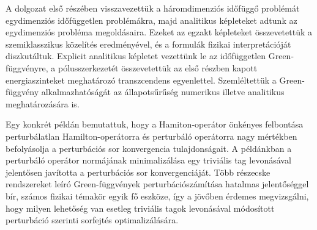 A dolgozat első részében visszavezettük a háromdimenziós időfüggő problémát egydimenziós időfüggetlen problémákra, majd analitikus képleteket adtunk az egydimenziós probléma megoldásaira. Ezeket az egzakt képleteket összevetettük a szemiklasszikus közelítés eredményével, és a formulák fizikai interpretációját diszkutáltuk. Explicit analitikus képletet vezettünk le az időfüggetlen Green-függvényre, a pólusszerkezetét összevetettük az első részben kapott energiaszinteket meghatározó transzcendens egyenlettel. Szemléltettük a Green-függvény alkalmazhatóságát az állapotsűrűség numerikus illetve analitikus meghatározására is.

Egy konkrét példán bemutattuk, hogy a Hamiton-operátor önkényes felbontása perturbálatlan Hamilton-operátorra és perturbáló operátorra nagy mértékben befolyásolja a perturbációs sor konvergencia tulajdonságait. A példánkban a perturbáló operátor normájának minimalizálása egy triviális tag levonásával jelentősen javította a perturbációs sor konvergenciáját. Több részecske rendszereket leíró Green-függvények perturbációszámítása hatalmas jelentőséggel bír, számos fizikai témakör egyik fő eszköze, így a jövőben érdemes megvizsgálni, hogy milyen lehetőség van esetleg triviális tagok levonásával módosított perturbáció szerinti sorfejtés optimalizálására.